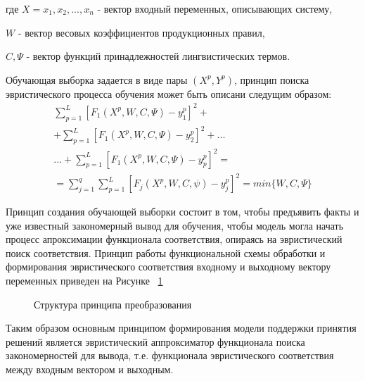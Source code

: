 где $X = {x_1, x_2, ..., x_n}$ - вектор входный переменных, описывающих систему,

$W$ - вектор весовых коэффициентов продукционных правил,

$C,\Psi$ - вектор функций принадлежностей лингвистических термов.


Обучающая выборка задается в виде пары $(X^p, Y^p)$, принцип поиска эвристического процесса обучения может быть описани следущим образом:
\begin{equation}
    \label{eq:equation58}
    \begin{alignedat}{2}
        \sum_{p=1}^L[F_1(X^p,W,C,\Psi) - y_1^p]^2 + \\
        + \sum_{p=1}^L[F_1(X^p,W,C,\Psi) - y_2^p]^2 +  ... \\
       ... +  \sum_{p=1}^L[F_1(X^p,W,C,\Psi) - y_p^p]^2 = \\
        = \sum_{j = 1}^q{\sum_{p=1}^L{[F_j(X^p,W,C,\psi) - y^p_j]^2}}
        = min\{W,C,\Psi\}
    \end{alignedat}
\end{equation}

Принцип создания обучающей выборки состоит в том, чтобы предъявить факты и уже известный закономерный вывод для обучения, чтобы модель могла начать процесс апроксимации функционала соответствия, опираясь на эвристический поиск соответствия.
Принцип работы функциональной схемы обработки и формирования эвристического соответствия входному и выходному вектору переменных приведен на Рисунке ~\cref{fig:FL}
\begin{figure}[ht]
    \caption{Структура принципа преобразования}\label{fig:FL}
\end{figure}

Таким образом основным принципом формирования модели поддержки принятия решений является эвристический аппроксиматор функционала поиска закономерностей для вывода, т.е. функционала эвристического соответствия между входным вектором и выходным.

